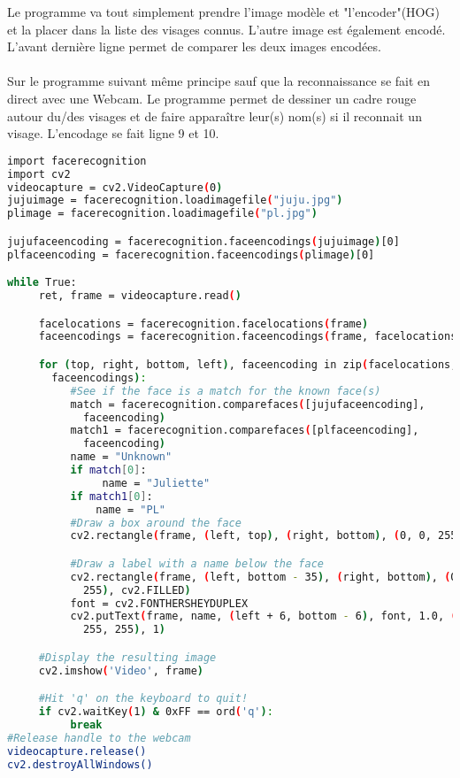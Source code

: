 Le programme va tout simplement prendre l'image modèle et "l'encoder"(HOG) et
la placer dans la liste des visages connus. L'autre image est également
encodé. L'avant dernière ligne permet de comparer les deux images encodées.
\\
\\
Sur le programme suivant même principe sauf que la reconnaissance se fait en direct
avec une Webcam. Le programme permet de dessiner un cadre rouge autour du/des
visages et de faire apparaître leur(s) nom(s) si il reconnait un visage.
L'encodage se fait ligne 9 et 10.
\newpage
\begin{lstlisting}[language=bash]
import facerecognition
import cv2
videocapture = cv2.VideoCapture(0)
jujuimage = facerecognition.loadimagefile("juju.jpg")
plimage = facerecognition.loadimagefile("pl.jpg")

jujufaceencoding = facerecognition.faceencodings(jujuimage)[0]
plfaceencoding = facerecognition.faceencodings(plimage)[0]

while True:
     ret, frame = videocapture.read()

     facelocations = facerecognition.facelocations(frame)
     faceencodings = facerecognition.faceencodings(frame, facelocations)

     for (top, right, bottom, left), faceencoding in zip(facelocations,
       faceencodings):
          #See if the face is a match for the known face(s)
          match = facerecognition.comparefaces([jujufaceencoding],
            faceencoding)
          match1 = facerecognition.comparefaces([plfaceencoding],
            faceencoding)
          name = "Unknown"
          if match[0]:
               name = "Juliette"
          if match1[0]:
              name = "PL"
          #Draw a box around the face
          cv2.rectangle(frame, (left, top), (right, bottom), (0, 0, 255), 2)

          #Draw a label with a name below the face
          cv2.rectangle(frame, (left, bottom - 35), (right, bottom), (0, 0,
            255), cv2.FILLED)
          font = cv2.FONTHERSHEYDUPLEX
          cv2.putText(frame, name, (left + 6, bottom - 6), font, 1.0, (255,
            255, 255), 1)

     #Display the resulting image
     cv2.imshow('Video', frame)

     #Hit 'q' on the keyboard to quit!
     if cv2.waitKey(1) & 0xFF == ord('q'):
          break
#Release handle to the webcam
videocapture.release()
cv2.destroyAllWindows()
\end{lstlisting}
